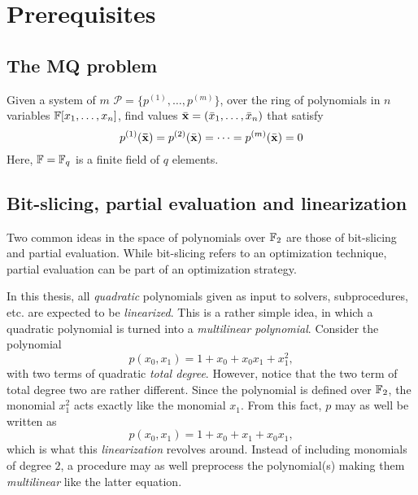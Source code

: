 \section{Prerequisites} \label{sec:prereq}
\subsection{The MQ problem}
\begin{defn}\label{sec1:def:mq}
    Given a system of $m$  $\mathcal{P} = \{p^{(1)}, \dots, p^{(m)}\}$, over the ring of polynomials in $n$ variables $\mathbb{F}[x_1, \dots, x_n]$, find values $\Bar{\mathbf{x}} = (\Bar{x}_1, \dots, \Bar{x}_n)$ that satisfy
    $$
        p^{(1)}(\mathbf{\Bar{\mathbf{x}}}) =  p^{(2)}(\Bar{\mathbf{x}}) = \dots = p^{(m)}(\Bar{\mathbf{x}}) = 0 
    $$
    Here, $\mathbb{F} = \mathbb{F}_q$ is a finite field of $q$ elements. 
\end{defn}

\subsection{Bit-slicing, partial evaluation and linearization}
Two common ideas in the space of polynomials over $\mathbb{F}_2$ are those of bit-slicing and partial evaluation. While bit-slicing refers to an optimization technique, partial evaluation can be part of an optimization strategy.

In this thesis, all \textit{quadratic} polynomials given as input to solvers, subprocedures, etc. are expected to be \textit{linearized}. This is a rather simple idea, in which a quadratic polynomial is turned into a \textit{multilinear polynomial}. Consider the polynomial
$$
    p(x_0, x_1) = 1 + x_0 + x_0x_1 + x_1^2, 
$$
with two terms of quadratic \textit{total degree}. However, notice that the two term of total degree two are rather different. Since the polynomial is defined over $\mathbb{F}_2$, the monomial $x_1^2$ acts exactly like the monomial $x_1$. From this fact, $p$ may as well be written as 
$$
    p(x_0, x_1) = 1 + x_0 + x_1 + x_0x_1,
$$
which is what this \textit{linearization} revolves around. Instead of including monomials of degree $2$, a procedure may as well preprocess the polynomial(s) making them \textit{multilinear} like the latter equation.

